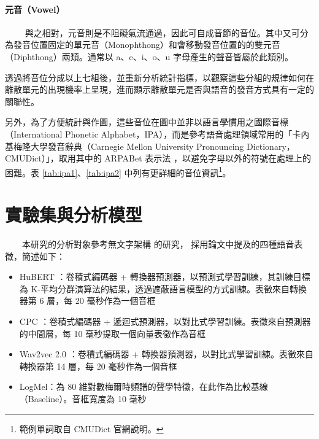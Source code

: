 {\paragraph{元音（Vowel）} \hfill \break
　　
        與之相對，元音則是不阻礙氣流通過，因此可自成音節的音位。其中又可分為發音位置固定的單元音（Monophthong）和會移動發音位置的的雙元音（Diphthong）兩類。通常以 a、e、i、o、u 字母產生的聲音皆屬於此類別。
        
        透過將音位分成以上七組後，並重新分析統計指標，以觀察這些分組的規律如何在離散單元的出現機率上呈現，進而顯示離散單元是否與語音的發音方式具有一定的關聯性。

        另外，為了方便統計與作圖，這些音位在圖中並非以語言學慣用之國際音標（International Phonetic Alphabet，IPA）\cite{international1999handbook}，而是參考語音處理領域常用的「卡內基梅隆大學發音辭典（Carnegie Mellon University Pronouncing Dictionary，CMUDict）\cite{noauthor_cmu_nodate}」，取用其中的 ARPABet 表示法 \cite{klautau2001arpabet}，以避免字母以外的符號在處理上的困難。表 \ref{tab:ipa1}、\ref{tab:ipa2} 中列有更詳細的音位資訊\footnote{範例單詞取自 CMUDict 官網說明。}。



\section{實驗集與分析模型}

　　本研究的分析對象參考無文字架構 \cite{noauthor_textless_2021, lakhotia_generative_2021, lakhotia_generative_2021-1} 的研究，
採用論文中提及的四種語音表徵，簡述如下：

\begin{itemize}
    \item HuBERT \cite{hsu_hubert_2021-2}：卷積式編碼器 + 轉換器預測器，以預測式學習訓練，其訓練目標為 K-平均分群演算法的結果，透過遮蔽語言模型的方式訓練。表徵來自轉換器第 6 層，每 20 毫秒作為一個音框
    \item CPC \cite{rivière2020unsupervised}：卷積式編碼器 + 遞迴式預測器，以對比式學習訓練。表徵來自預測器的中間層，每 10 毫秒提取一個向量表徵作為音框
    \item Wav2vec 2.0 \cite{baevski2020wav2vec}：卷積式編碼器 + 轉換器預測器，以對比式學習訓練。表徵來自轉換器第 14 層，每 20 毫秒作為一個音框
    \item LogMel：為 80 維對數梅爾時頻譜的聲學特徵，在此作為比較基線（Baseline）。音框寬度為 10 毫秒
\end{itemize}

}
